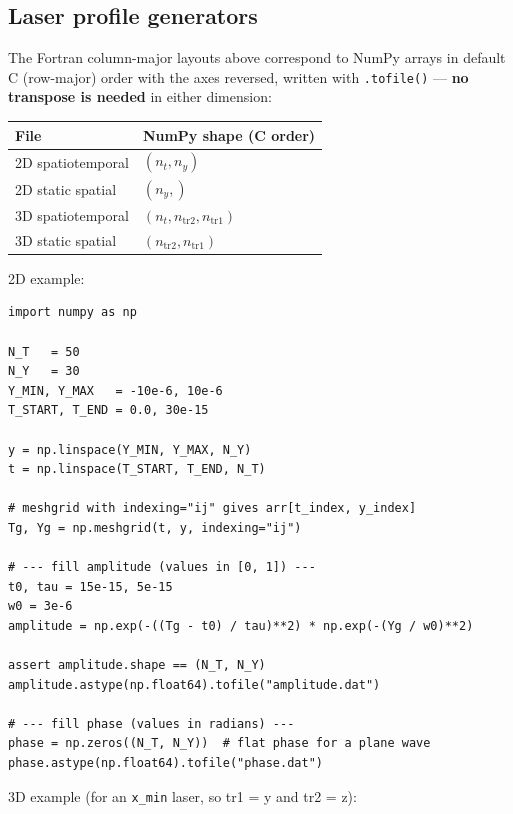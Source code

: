 \documentclass[11pt,a4paper]{article}
\begin{document}
\subsection{Laser profile generators}

The Fortran column-major layouts above correspond to NumPy arrays in
default C (row-major) order with the axes reversed, written with
\texttt{.tofile()} --- \textbf{no transpose is needed} in either
dimension:

\begin{table}[h]
\centering
\begin{tabular}{@{}ll@{}}
\toprule
File & NumPy shape (C order) \\
\midrule
2D spatiotemporal & $(n_t, n_y)$ \\
2D static spatial & $(n_y,)$ \\
3D spatiotemporal & $(n_t, n_{\mathrm{tr2}}, n_{\mathrm{tr1}})$ \\
3D static spatial & $(n_{\mathrm{tr2}}, n_{\mathrm{tr1}})$ \\
\bottomrule
\end{tabular}
\end{table}

2D example:

\begin{lstlisting}[style=python]
import numpy as np

N_T   = 50
N_Y   = 30
Y_MIN, Y_MAX   = -10e-6, 10e-6
T_START, T_END = 0.0, 30e-15

y = np.linspace(Y_MIN, Y_MAX, N_Y)
t = np.linspace(T_START, T_END, N_T)

# meshgrid with indexing="ij" gives arr[t_index, y_index]
Tg, Yg = np.meshgrid(t, y, indexing="ij")

# --- fill amplitude (values in [0, 1]) ---
t0, tau = 15e-15, 5e-15
w0 = 3e-6
amplitude = np.exp(-((Tg - t0) / tau)**2) * np.exp(-(Yg / w0)**2)

assert amplitude.shape == (N_T, N_Y)
amplitude.astype(np.float64).tofile("amplitude.dat")

# --- fill phase (values in radians) ---
phase = np.zeros((N_T, N_Y))  # flat phase for a plane wave
phase.astype(np.float64).tofile("phase.dat")
\end{lstlisting}

3D example (for an \texttt{x\_min} laser, so tr1 = y and tr2 = z):
\end{document}
